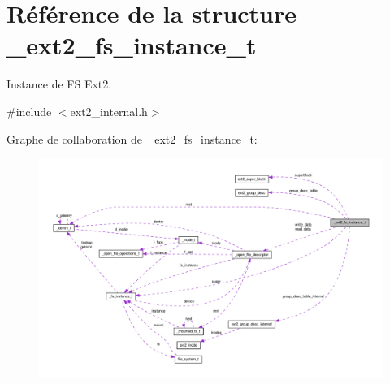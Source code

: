 \hypertarget{struct__ext2__fs__instance__t}{\section{Référence de la structure \-\_\-ext2\-\_\-fs\-\_\-instance\-\_\-t}
\label{struct__ext2__fs__instance__t}
}


Instance de F\-S Ext2.  




{\ttfamily \#include $<$ext2\-\_\-internal.\-h$>$}



Graphe de collaboration de \-\_\-ext2\-\_\-fs\-\_\-instance\-\_\-t\-:\nopagebreak
\begin{figure}[H]
\begin{center}
\leavevmode
\includegraphics[width=350pt]{struct__ext2__fs__instance__t__coll__graph}
\end{center}
\end{figure}
